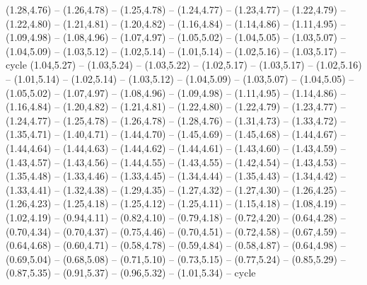 {(1.28,4.76) -- (1.26,4.78) -- (1.25,4.78) -- (1.24,4.77) -- (1.23,4.77) -- (1.22,4.79) -- (1.22,4.80) -- (1.21,4.81) -- (1.20,4.82) -- (1.16,4.84) -- (1.14,4.86) -- (1.11,4.95) -- (1.09,4.98) -- (1.08,4.96) -- (1.07,4.97) -- (1.05,5.02) -- (1.04,5.05) -- (1.03,5.07) -- (1.04,5.09) -- (1.03,5.12) -- (1.02,5.14) -- (1.01,5.14) -- (1.02,5.16) -- (1.03,5.17) -- cycle}
\expandafter\def\csname geo:gebiet:LUX\endcsname{
  (1.04,5.27) -- (1.03,5.24) -- (1.03,5.22) -- (1.02,5.17) -- (1.03,5.17) -- (1.02,5.16) -- (1.01,5.14) -- (1.02,5.14) -- (1.03,5.12) -- (1.04,5.09) -- (1.03,5.07) -- (1.04,5.05) -- (1.05,5.02) -- (1.07,4.97) -- (1.08,4.96) -- (1.09,4.98) -- (1.11,4.95) -- (1.14,4.86) -- (1.16,4.84) -- (1.20,4.82) -- (1.21,4.81) -- (1.22,4.80) -- (1.22,4.79) -- (1.23,4.77) -- (1.24,4.77) -- (1.25,4.78) -- (1.26,4.78) -- (1.28,4.76) -- (1.31,4.73) -- (1.33,4.72) -- (1.35,4.71) -- (1.40,4.71) -- (1.44,4.70) -- (1.45,4.69) -- (1.45,4.68) -- (1.44,4.67) -- (1.44,4.64) -- (1.44,4.63) -- (1.44,4.62) -- (1.44,4.61) -- (1.43,4.60) -- (1.43,4.59) -- (1.43,4.57) -- (1.43,4.56) -- (1.44,4.55) -- (1.43,4.55) -- (1.42,4.54) -- (1.43,4.53) -- (1.35,4.48) -- (1.33,4.46) -- (1.33,4.45) -- (1.34,4.44) -- (1.35,4.43) -- (1.34,4.42) -- (1.33,4.41) -- (1.32,4.38) -- (1.29,4.35) -- (1.27,4.32) -- (1.27,4.30) -- (1.26,4.25) -- (1.26,4.23) -- (1.25,4.18) -- (1.25,4.12) -- (1.25,4.11) -- (1.15,4.18) -- (1.08,4.19) -- (1.02,4.19) -- (0.94,4.11) -- (0.82,4.10) -- (0.79,4.18) -- (0.72,4.20) -- (0.64,4.28) -- (0.70,4.34) -- (0.70,4.37) -- (0.75,4.46) -- (0.70,4.51) -- (0.72,4.58) -- (0.67,4.59) -- (0.64,4.68) -- (0.60,4.71) -- (0.58,4.78) -- (0.59,4.84) -- (0.58,4.87) -- (0.64,4.98) -- (0.69,5.04) -- (0.68,5.08) -- (0.71,5.10) -- (0.73,5.15) -- (0.77,5.24) -- (0.85,5.29) -- (0.87,5.35) -- (0.91,5.37) -- (0.96,5.32) -- (1.01,5.34) -- cycle}
